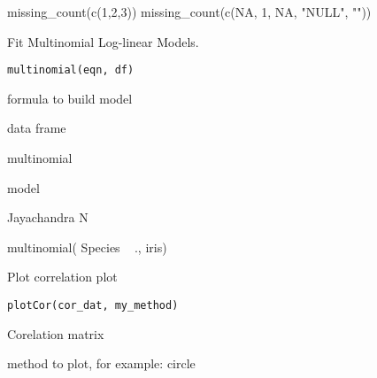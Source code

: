 \documentclass[a4paper]{book}
\begin{document}
%
\begin{Examples}
\begin{ExampleCode}
missing_count(c(1,2,3))
missing_count(c(NA, 1, NA, "NULL", ""))
\end{ExampleCode}
\end{Examples}
%
\begin{Description}\relax
Fit Multinomial Log-linear Models.
\end{Description}
%
\begin{Usage}
\begin{verbatim}
multinomial(eqn, df)
\end{verbatim}
\end{Usage}
%
\begin{Arguments}
\begin{ldescription}
\item[\code{eqn}] formula to build model

\item[\code{df}] data frame
\end{ldescription}
\end{Arguments}
%
\begin{Details}\relax
multinomial
\end{Details}
%
\begin{Value}
model
\end{Value}
%
\begin{Author}\relax
Jayachandra N
\end{Author}
%
\begin{Examples}
\begin{ExampleCode}
multinomial( Species ~ .,  iris)
\end{ExampleCode}
\end{Examples}
%
\begin{Description}\relax
Plot correlation plot
\end{Description}
%
\begin{Usage}
\begin{verbatim}
plotCor(cor_dat, my_method)
\end{verbatim}
\end{Usage}
%
\begin{Arguments}
\begin{ldescription}
\item[\code{cor\_dat}] Corelation matrix

\item[\code{my\_method}] method to plot, for example: circle
\end{ldescription}
\end{Arguments}
\end{document}

